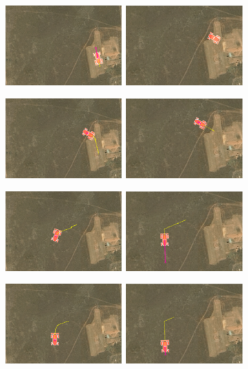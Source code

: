 \begin{figure}[ht!]
  \centering
  \begin{subfigure}[b]{0.8\columnwidth}
    \includegraphics[width=\textwidth]{img/follow1.png}
  \end{subfigure}
  \begin{subfigure}[b]{0.8\columnwidth}
    \includegraphics[width=\textwidth]{img/follow2.png}
  \end{subfigure}
  \begin{subfigure}[b]{0.8\columnwidth}
    \includegraphics[width=\textwidth]{img/follow3.png}
  \end{subfigure}
  \begin{subfigure}[b]{0.8\columnwidth}
    \includegraphics[width=\textwidth]{img/follow4.png}

\end{subfigure}
\end{figure}
